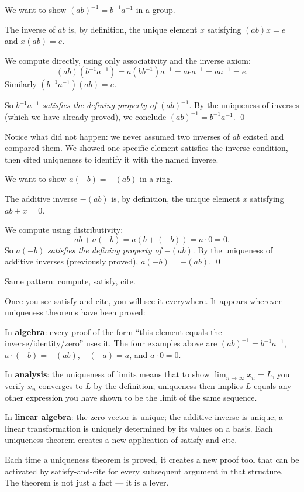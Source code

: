 \begin{example}[Socks-shoes property: $(ab)^{-1} = b^{-1}a^{-1}$]
We want to show $(ab)^{-1} = b^{-1}a^{-1}$ in a group.

The inverse of $ab$ is, by definition, the unique element $x$
satisfying $(ab)x = e$ and $x(ab) = e$.

We compute directly, using only associativity and the inverse axiom:
\[
(ab)(b^{-1}a^{-1})
= a(bb^{-1})a^{-1}
= a e a^{-1}
= aa^{-1} = e.
\]
Similarly $(b^{-1}a^{-1})(ab) = e$.

So $b^{-1}a^{-1}$ \emph{satisfies the defining property of $(ab)^{-1}$}.
By the uniqueness of inverses (which we have already proved), we
conclude $(ab)^{-1} = b^{-1}a^{-1}$. \qed

\medskip
\noindent
Notice what did not happen: we never assumed two inverses of $ab$ existed
and compared them. We showed one specific element satisfies the inverse
condition, then cited uniqueness to identify it with the named inverse.
\end{example}

\begin{example}[Ring theorem: $a \cdot (-b) = -(ab)$]
We want to show $a(-b) = -(ab)$ in a ring.

The additive inverse $-(ab)$ is, by definition, the unique element $x$
satisfying $ab + x = 0$.

We compute using distributivity:
\[
ab + a(-b) = a(b + (-b)) = a \cdot 0 = 0.
\]
So $a(-b)$ \emph{satisfies the defining property of $-(ab)$}.
By the uniqueness of additive inverses (previously proved), $a(-b) = -(ab)$. \qed

\medskip
\noindent Same pattern: compute, satisfy, cite.
\end{example}

\begin{remark}
Once you see satisfy-and-cite, you will see it everywhere. It appears
wherever uniqueness theorems have been proved:

\medskip
\noindent In \textbf{algebra}: every proof of the form ``this element equals
the inverse/identity/zero'' uses it. The four examples above are
$(ab)^{-1} = b^{-1}a^{-1}$, $a \cdot (-b) = -(ab)$, $-(-a) = a$,
and $a \cdot 0 = 0$.

\noindent In \textbf{analysis}: the uniqueness of limits means that to
show $\lim_{n \to \infty} x_n = L$, you verify $x_n$ converges to $L$
by the definition; uniqueness then implies $L$ equals any other
expression you have shown to be the limit of the same sequence.

\noindent In \textbf{linear algebra}: the zero vector is unique; the
additive inverse is unique; a linear transformation is uniquely determined
by its values on a basis. Each uniqueness theorem creates a new application
of satisfy-and-cite.

\medskip
\noindent
Each time a uniqueness theorem is proved, it creates a new proof tool
that can be activated by satisfy-and-cite for every subsequent argument
in that structure. The theorem is not just a fact --- it is a lever.
\end{remark}

